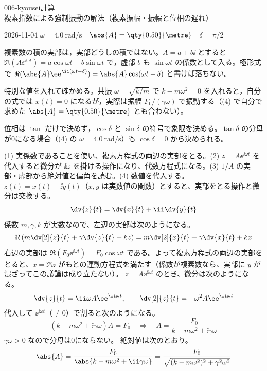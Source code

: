 \documentclass[uplatex,dvipdfmx,a4paper,11pt]{jsarticle}
\begin{document}
\begin{mondai}{006-kyousei}{計算}{複素指数による強制振動の解法（複素振幅・振幅と位相の遅れ）}
\begin{kotaeutsushi}{2026-11-04}
$\omega=\qty{4.0}{\radian\per\second}$　$\abs{A}=\qty{0.50}{\metre}$　$\delta=\pi/2$
\end{kotaeutsushi}
\begin{kizuki}
\item 複素数の積の実部は，実部どうしの積ではない。$A=a+b\ii$ とすると $\Re(A\ee^{\ii\omega t})=a\cos\omega t-b\sin\omega t$ で，虚部 $b$ も $\sin\omega t$ の係数として入る。極形式で $\Re(\abs{A}\ee^{\ii(\omega t-\delta)})=\abs{A}\cos(\omega t-\delta)$ と書けば落ちない。
\item 特別な値を入れて確かめる。共振 $\omega=\sqrt{k/m}$ で $k-m\omega^{2}=0$ を入れると，自分の式では $x(t)=0$ になるが，実際は振幅 $F_{0}/(\gamma\omega)$ で振動する（(4) で自分で求めた $\abs{A}=\qty{0.50}{\metre}$ とも合わない）。
\item 位相は $\tan$ だけで決めず，$\cos\delta$ と $\sin\delta$ の符号で象限を決める。$\tan\delta$ の分母が0になる場合（(4) の $\omega=\qty{4.0}{\radian\per\second}$）も $\cos\delta=0$ から決められる。
\end{kizuki}
\begin{tadashii}
\houshin (1) 実係数であることを使い、複素方程式の両辺の実部をとる。(2) $z=A\ee^{\ii\omega t}$ を代入すると微分が $\ii\omega$ を掛ける操作になり、代数方程式になる。(3) $1/A$ の実部・虚部から絶対値と偏角を読む。(4) 数値を代入する。
\keisan {} $z(t)=x(t)+\ii y(t)$（$x,y$ は実数値の関数）とすると、実部をとる操作と微分は交換する。
\[ \dv{z}{t}=\dv{x}{t}+\ii\dv{y}{t} \]
係数 $m,\gamma,k$ が実数なので、左辺の実部は次のようになる。
\[ \Re\left(m\dv[2]{z}{t}+\gamma\dv{z}{t}+kz\right)=m\dv[2]{x}{t}+\gamma\dv{x}{t}+kx \]
右辺の実部は $\Re(F_{0}\ee^{\ii\omega t})=F_{0}\cos\omega t$ である。よって複素方程式の両辺の実部をとると、$x=\Re z$ がもとの運動方程式を満たす（係数が複素数なら、実部に $y$ が混ざってこの議論は成り立たない）。
 $z=A\ee^{\ii\omega t}$ のとき、微分は次のようになる。
\[ \dv{z}{t}=\ii\omega A\ee^{\ii\omega t},\qquad \dv[2]{z}{t}=-\omega^{2}A\ee^{\ii\omega t} \]
代入して $\ee^{\ii\omega t}$（$\neq0$）で割ると次のようになる。
\[ (k-m\omega^{2}+\ii\gamma\omega)A=F_{0}\quad\Longrightarrow\quad A=\frac{F_{0}}{k-m\omega^{2}+\ii\gamma\omega} \]
$\gamma\omega>0$ なので分母は0にならない。
 絶対値は次のとおり。
\[ \abs{A}=\frac{F_{0}}{\abs{k-m\omega^{2}+\ii\gamma\omega}}=\frac{F_{0}}{\sqrt{(k-m\omega^{2})^{2}+\gamma^{2}\omega^{2}}} \]

\end{tadashii}
\end{mondai}
\end{document}
